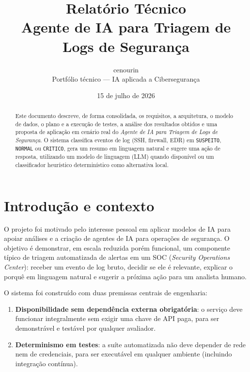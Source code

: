 \documentclass[11pt,a4paper]{article}
\title{\textbf{Relatório Técnico}\\[4pt]
\large Agente de IA para Triagem de Logs de Segurança}
\author{cenourin \\ \small Portfólio técnico --- IA aplicada a Cibersegurança}
\date{15 de julho de 2026}
\begin{document}
\maketitle

\begin{abstract}
\noindent Este documento descreve, de forma consolidada, os requisitos, a arquitetura,
o modelo de dados, o plano e a execução de testes, a análise dos resultados obtidos e
uma proposta de aplicação em cenário real do \emph{Agente de IA para Triagem de Logs de
Segurança}. O sistema classifica eventos de log (SSH, firewall, EDR) em
\texttt{SUSPEITO}, \texttt{NORMAL} ou \texttt{CRITICO}, gera um resumo em linguagem
natural e sugere uma ação de resposta, utilizando um modelo de linguagem (LLM) quando
disponível ou um classificador heurístico determinístico como alternativa local.
\end{abstract}

\tableofcontents

\section{Introdução e contexto}

O projeto foi motivado pelo interesse pessoal em aplicar modelos de IA para apoiar
análises e a criação de agentes de IA para operações de segurança. O objetivo é
demonstrar, em escala reduzida porém funcional, um componente
típico de triagem automatizada de alertas em um SOC (\emph{Security Operations Center}):
receber um evento de log bruto, decidir se ele é relevante, explicar o porquê em
linguagem natural e sugerir a próxima ação para um analista humano.

O sistema foi construído com duas premissas centrais de engenharia:

\begin{enumerate}
  \item \textbf{Disponibilidade sem dependência externa obrigatória}: o serviço deve
  funcionar integralmente sem exigir uma chave de API paga, para ser demonstrável e
  testável por qualquer avaliador.
  \item \textbf{Determinismo em testes}: a suíte automatizada não deve depender de rede
  nem de credenciais, para ser executável em qualquer ambiente (incluindo integração
  contínua).
\end{enumerate}
\end{document}
